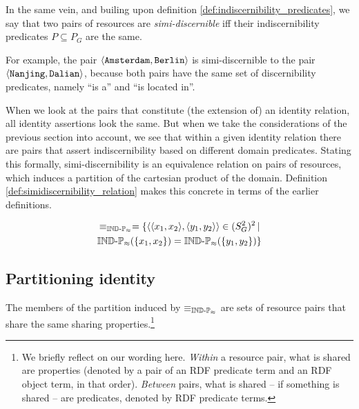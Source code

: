 In the same vein,
  and builing upon definition \ref{def:indiscernibility_predicates},
  we say that two pairs of resources are \emph{simi-discernible}
  iff their \mbox{indiscernibility} predicates $P \subseteq P_G$ are the same.

For example, the pair {\small $\langle\texttt{Amsterdam},\texttt{Berlin}\rangle$}
  is simi-discernible to the pair
  {\small $\langle\texttt{Nanjing},\texttt{Dalian}\rangle$},
  because both pairs have the same set of discernibility predicates,
  namely ``is a'' and ``is located in''.

When we look at the pairs that constitute (the extension of)
  an identity relation, all identity assertions look the same.
But when we take the considerations of the previous section into account,
  we see that within a given identity relation
  there are pairs that assert indiscernibility
  based on different domain predicates.
Stating this formally,
  simi-discernibility is an equivalence relation on pairs of resources,
  which induces a partition of the cartesian product of the domain.
Definition \ref{def:simidiscernibility_relation} makes this concrete
  in terms of the earlier definitions.

\begin{definition}
\label{def:simidiscernibility_relation}
\begin{align}
  \equiv_{\operatorname{{\mathbb{IND}-\mathbb{P}}}_{\approx}}
=
  \{
    \langle\langle x_1,x_2\rangle,\langle y_1,y_2\rangle\rangle \in (S_G^2)^2
  \,\vert\,\nonumber\\
    \operatorname{{\mathbb{IND}-\mathbb{P}}}_{\approx}(\{x_1,x_2\}) = \operatorname{{\mathbb{IND}-\mathbb{P}}}_{\approx}(\{y_1,y_2\})
  \}\nonumber
\end{align}
\end{definition}



\subsection{Partitioning identity}

The members of the partition induced by $\equiv_{\operatorname{{\mathbb{IND}-\mathbb{P}}}_{\approx}}$
  are sets of resource pairs that share the same sharing properties.\footnote{
    We briefly reflect on our wording here.
    \emph{Within} a resource pair, what is shared are properties
      (denoted by a pair of an RDF predicate term and an RDF object term,
      in that order).
    \emph{Between} pairs, what is shared -- if something is shared --
      are predicates, denoted by RDF predicate terms.
  }

